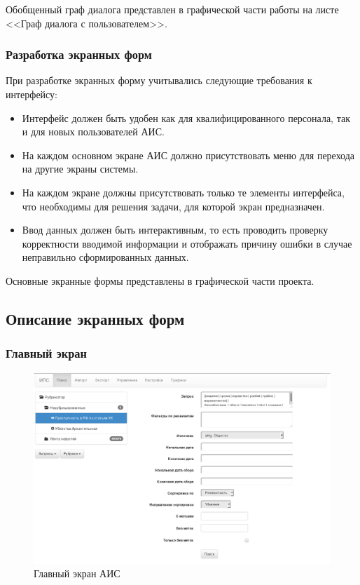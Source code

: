 Обобщенный граф диалога представлен в графической части работы на листе <<Граф диалога с пользователем>>. %


\clearpage
\subsubsection{Разработка экранных форм}

При разработке экранных форму учитывались следующие требования к интерфейсу:
\begin{itemize}
\item Интерфейс должен быть удобен как для квалифицированного персонала, так и для новых пользователей АИС.
\item На каждом основном экране АИС должно присутствовать меню для перехода на другие экраны системы.
\item На каждом экране должны присутствовать только те элементы интерфейса, что необходимы для решения задачи, для которой экран предназначен.
\item Ввод данных должен быть интерактивным, то есть проводить проверку корректности вводимой информации и отображать причину ошибки в случае неправильно сформированных данных.
\end{itemize}

Основные экранные формы представлены в графической части проекта.

\clearpage
\subsection{Описание экранных форм}

\subsubsection{Главный экран}

  \begin{figure}[h!]
  \centering
  \includegraphics[width=0.9\linewidth]{technology/gui_main}
  \caption{Главный экран АИС}
  \label{figure:guiMain}
  \end{figure}

